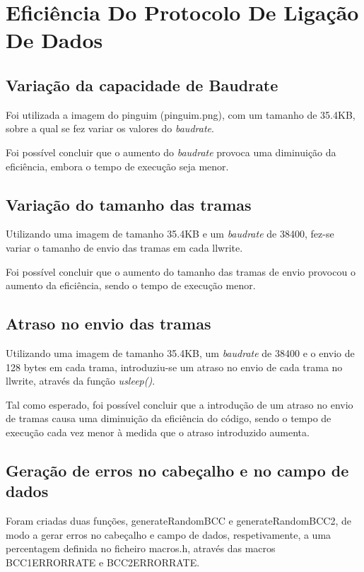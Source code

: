 \documentclass[11pt]{article}
\begin{document}
\section{Eficiência Do Protocolo De Ligação De Dados}

\subsection{Variação da capacidade de Baudrate}

Foi utilizada a imagem do pinguim (pinguim.png), com um tamanho de 35.4KB, sobre a qual se fez variar os valores do \textit{baudrate}.

Foi possível concluir que o aumento do \textit{baudrate} provoca uma diminuição da eficiência, embora o tempo de execução seja menor.

\subsection{Variação do tamanho das tramas}

Utilizando uma imagem de tamanho 35.4KB e um \textit{baudrate} de 38400, fez-se variar o tamanho de envio das tramas em cada llwrite.

Foi possível concluir que o aumento do tamanho das tramas de envio provocou o aumento da eficiência, sendo o tempo de execução menor.

\subsection{Atraso no envio das tramas}

Utilizando uma imagem de tamanho 35.4KB, um \textit{baudrate} de 38400 e o envio de 128 bytes em cada trama, introduziu-se um atraso no envio de cada trama no llwrite, através da função \textit{usleep()}.

Tal como esperado, foi possível concluir que a introdução de um atraso no envio de tramas causa uma diminuição da eficiência do código, sendo o tempo de execução cada vez menor à medida que o atraso introduzido aumenta.

\subsection{Geração de erros no cabeçalho e no campo de dados}

Foram criadas duas funções, generateRandomBCC e generateRandomBCC2, de modo a gerar erros no cabeçalho e campo de dados, respetivamente, a uma percentagem definida no ficheiro macros.h, através das macros BCC1ERRORRATE e BCC2ERRORRATE.
\end{document}
